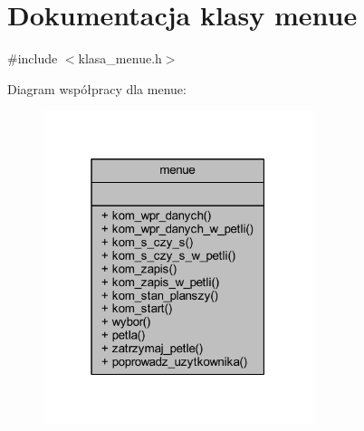 \hypertarget{classmenue}{}\section{Dokumentacja klasy menue}
\label{classmenue}


{\ttfamily \#include $<$klasa\+\_\+menue.\+h$>$}



Diagram współpracy dla menue\+:
\nopagebreak
\begin{figure}[H]
\begin{center}
\leavevmode
\includegraphics[width=223pt]{classmenue__coll__graph}
\end{center}
\end{figure}
